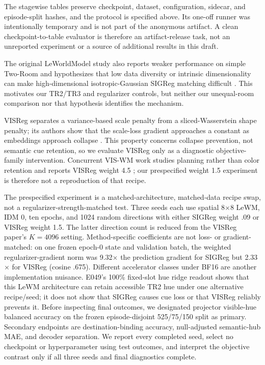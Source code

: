 \documentclass{article}
\begin{document}
The stagewise tables preserve checkpoint, dataset, configuration, sidecar, and
episode-split hashes, and the protocol is specified above.  Its one-off runner
was intentionally temporary and is not part of the anonymous artifact.  A
clean checkpoint-to-table evaluator is therefore an artifact-release task, not
an unreported experiment or a source of additional results in this draft.

The original LeWorldModel study also reports weaker performance on simple
Two-Room and hypothesizes that low data diversity or intrinsic dimensionality
can make high-dimensional isotropic-Gaussian SIGReg matching difficult
\citep{maes2026leworldmodel}.  This motivates our TR2/TR3 and regularizer
controls, but neither our unequal-room comparison nor that hypothesis identifies
the mechanism.

VISReg separates a variance-based scale penalty from a sliced-Wasserstein shape
penalty; its authors show that the scale-loss gradient approaches a constant as
embeddings approach collapse \citep{wu2026visreg}.  This property concerns
collapse prevention, not semantic cue retention, so we evaluate VISReg only as
a diagnostic objective-family intervention.  Concurrent VIS-WM work studies
planning rather than color retention and reports VISReg weight 4.5
\citep{wu2026viscore}; our prespecified weight 1.5 experiment is therefore not a
reproduction of that recipe.

The prespecified experiment is a matched-architecture, matched-data recipe
swap, not a regularizer-strength-matched test.  Three seeds each use spatial
8$\times$8 LeWM, IDM 0, ten epochs, and 1024 random directions with either
SIGReg weight .09 or VISReg weight 1.5.  The latter direction count is reduced
from the VISReg paper's $K=4096$ setting.  Method-specific coefficients are not
loss- or gradient-matched: on one frozen epoch-0 state and validation batch,
the weighted regularizer-gradient norm was 9.32$\times$ the prediction gradient
for SIGReg but 2.33$\times$ for VISReg (cosine .675).  Different accelerator
classes under BF16 are another implementation nuisance.  E049's 100\% fixed-slot
hue ridge readout shows that this LeWM architecture can retain accessible TR2
hue under one alternative recipe/seed; it does not show that SIGReg causes cue
loss or that VISReg reliably prevents it.
Before inspecting final outcomes, we designated projector visible-hue balanced
accuracy on the frozen episode-disjoint 525/75/150 split as primary.  Secondary
endpoints are destination-binding accuracy, null-adjusted semantic-hub MAE,
and decoder separation.  We report every completed seed, select no checkpoint
or hyperparameter using test outcomes, and interpret the objective contrast
only if all three seeds and final diagnostics complete.
\end{document}
